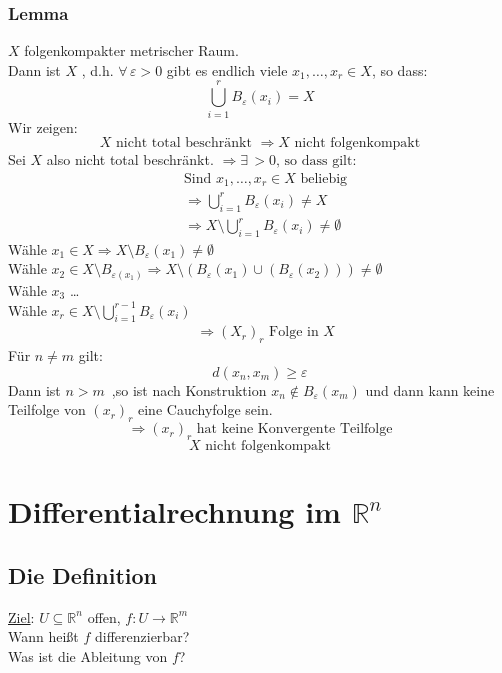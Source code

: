 \subsubsection{Lemma} %
\label{ssub:lemma}
$X$ folgenkompakter metrischer Raum. \\
Dann ist $X$ , d.h. $\forall\, \varepsilon>0$ gibt es endlich viele $x_1,\dots,x_r \in X$, so dass:
\[
	\bigcup\limits_{i=1}^r B_{\varepsilon}(x_i)=X
\]
 Wir zeigen: 
\[
	X \text{ nicht total beschränkt } \Rightarrow X \text{ nicht folgenkompakt}
\]
Sei $X$ also nicht total beschränkt. $\Rightarrow \exists\,>0 \text{, so dass gilt:}$
\begin{align*}
		&\text{Sind } x_1,\dots,x_r \in X \text{ beliebig} \\
		&\Rightarrow \bigcup\limits_{i=1}^rB_{\varepsilon}(x_i) \neq X \\
		&\Rightarrow X \setminus \bigcup\limits_{i=1}^rB_{\varepsilon}(x_i) \neq \emptyset
\end{align*}
Wähle $x_1 \in X \Rightarrow X \setminus B_{\varepsilon}(x_1) \neq \emptyset$ \\
Wähle $x_2 \in X \setminus B_{\varepsilon(x_1)} \Rightarrow X \setminus (B_{\varepsilon}(x_1)\cup(B_{\varepsilon}(x_2))) \neq \emptyset$ \\
Wähle $x_3$ \dots \\
Wähle $x_r \in X \setminus \bigcup\limits_{i=1}^{r-1}B_{\varepsilon}(x_i)$
\begin{align*}
	&\Rightarrow (X_r)_r \text{ Folge in }X 
\end{align*}	
	Für $n \neq m$ gilt: 
	\[
		d(x_n,x_m) \geq \varepsilon
	\]
	Dann ist $n>m$ \,,so ist nach Konstruktion  $x_n \notin B_{\varepsilon}(x_m)$ und 
	dann kann keine Teilfolge von $(x_r)_r$ eine Cauchyfolge sein.
 \[
 	\Rightarrow  (x_r)_r \text{ hat keine Konvergente Teilfolge} \]
	\[
		X \text{ nicht folgenkompakt}
	\]
\bewende


\newpage
\section{Differentialrechnung im $\mathbb{R}^n$} %
\label{sec:differentialrechnung_im_mathbb_r_n}

\subsection{Die Definition} %
\label{sub:die_definition}
\underline{Ziel}: $U \subseteq  \mathbb{R}^n$ offen, $f: U \to \mathbb{R}^m$ \\
Wann heißt $f$ differenzierbar? \\
Was ist die Ableitung von $f$? 
